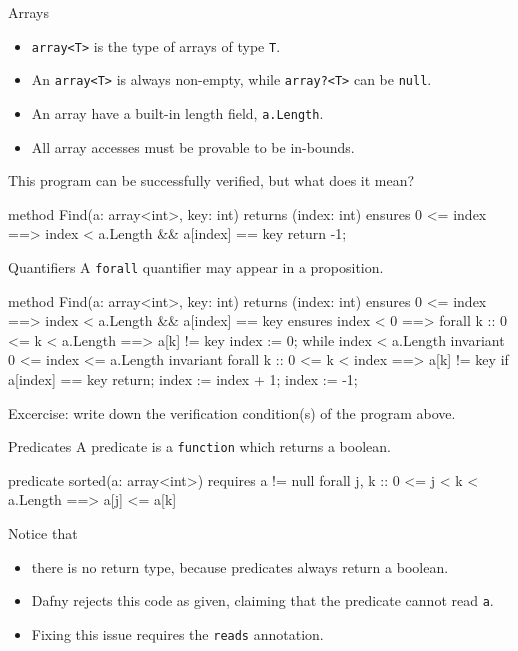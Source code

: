 \documentclass[10pt, compress]{beamer}
\begin{document}
\begin{frame}[fragile]{Arrays}
  \begin{itemize}
  \item \verb|array<T>| is the type of arrays of type \verb|T|.
  \item An \verb|array<T>| is always non-empty, while \verb|array?<T>| can be \verb|null|.
  \item An array have a built-in length field, \verb|a.Length|.
  \item All array accesses must be provable to be in-bounds.
  \end{itemize}
  This program can be successfully verified, but what does it mean?
  \begin{verbnobox}[\footnotesize]
method Find(a: array<int>, key: int) returns (index: int)
   ensures 0 <= index ==> index < a.Length && a[index] == key
{
   return -1;
}
  \end{verbnobox}
\end{frame}

\begin{frame}[fragile]{Quantifiers}
  A \verb|forall| quantifier may appear in a proposition.

  \begin{verbnobox}[\scriptsize]
method Find(a: array<int>, key: int) returns (index: int)
   ensures 0 <= index ==> index < a.Length && a[index] == key
   ensures index < 0 ==> forall k :: 0 <= k < a.Length ==> a[k] != key
{
   index := 0;
   while index < a.Length
      invariant 0 <= index <= a.Length
      invariant forall k :: 0 <= k < index ==> a[k] != key
   {
      if a[index] == key { return; }
      index := index + 1;
   }
   index := -1;
}
  \end{verbnobox}
  Excercise: write down the verification condition(s) of the program above.
\end{frame}

\begin{frame}[fragile]{Predicates}
  A predicate is a \verb|function| which returns a boolean. 
  \begin{verbnobox}[\footnotesize]
predicate sorted(a: array<int>)
   requires a != null
{
   forall j, k :: 0 <= j < k < a.Length ==> a[j] <= a[k]
}
  \end{verbnobox}
Notice that
  \begin{itemize}
  \item there is no return type, because predicates always return a boolean.
  \item Dafny rejects this code as given, claiming that the predicate cannot read \verb|a|.
  \item Fixing this issue requires the \verb|reads| annotation.
  \end{itemize}
\end{frame}
\end{document}
